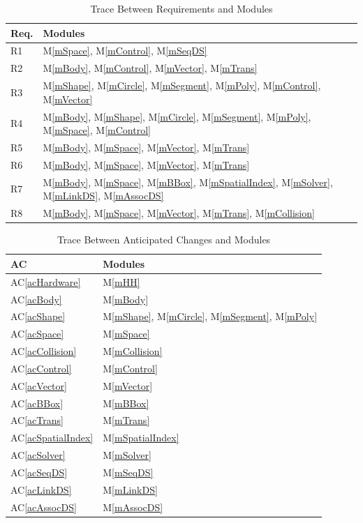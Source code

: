 \documentclass[12pt]{article}
\begin{document}
\begin{table}[h!]
\centering
\begin{tabular}{p{} p{}}
\toprule
\textbf{Req.} & \textbf{Modules}\\
\midrule
	R1 & M\ref{mSpace}, M\ref{mControl}, M\ref{mSeqDS} \\
	R2 & M\ref{mBody}, M\ref{mControl}, M\ref{mVector}, M\ref{mTrans} \\
	R3 & M\ref{mShape}, M\ref{mCircle}, M\ref{mSegment}, M\ref{mPoly}, M\ref{mControl}, M\ref{mVector} \\
	R4 & M\ref{mBody}, M\ref{mShape}, M\ref{mCircle}, M\ref{mSegment}, M\ref{mPoly}, M\ref{mSpace}, M\ref{mControl} \\
	R5 & M\ref{mBody}, M\ref{mSpace}, M\ref{mVector}, M\ref{mTrans} \\
	R6 & M\ref{mBody}, M\ref{mSpace}, M\ref{mVector}, M\ref{mTrans} \\
	R7 & M\ref{mBody}, M\ref{mSpace}, M\ref{mBBox}, M\ref{mSpatialIndex}, M\ref{mSolver}, M\ref{mLinkDS}, M\ref{mAssocDS} \\
	R8 & M\ref{mBody}, M\ref{mSpace}, M\ref{mVector}, M\ref{mTrans}, M\ref{mCollision} \\
\bottomrule
\end{tabular}
\caption{Trace Between Requirements and Modules}
\label{TblRT}
\end{table}

\begin{table}[h!]
\centering
\begin{tabular}{p{} p{}}
\toprule
	\textbf{AC} & \textbf{Modules}\\
\midrule
	AC\ref{acHardware} & M\ref{mHH} \\
	AC\ref{acBody} & M\ref{mBody} \\
	AC\ref{acShape} & M\ref{mShape}, M\ref{mCircle}, M\ref{mSegment}, M\ref{mPoly} \\
	AC\ref{acSpace} & M\ref{mSpace} \\
	AC\ref{acCollision} & M\ref{mCollision} \\
	AC\ref{acControl} & M\ref{mControl} \\
	AC\ref{acVector} & M\ref{mVector} \\
	AC\ref{acBBox} & M\ref{mBBox} \\
	AC\ref{acTrans} & M\ref{mTrans} \\
	AC\ref{acSpatialIndex} & M\ref{mSpatialIndex} \\
	AC\ref{acSolver} & M\ref{mSolver} \\
	AC\ref{acSeqDS} & M\ref{mSeqDS} \\
	AC\ref{acLinkDS} & M\ref{mLinkDS} \\
	AC\ref{acAssocDS} & M\ref{mAssocDS} \\
\bottomrule
\end{tabular}
\caption{Trace Between Anticipated Changes and Modules}
\label{TblAT}
\end{table}
\end{document}
